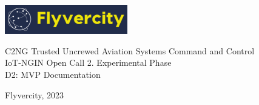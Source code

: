 \documentclass[a4paper]{article}
\begin{document}
 
\thispagestyle{empty}
\begin{flushright}
    \includegraphics[width=0.4\textwidth]{docs/images/Logo.png}
\end{flushright}
\vfill
\begin{center}
    {\LARGE C2NG Trusted Uncrewed Aviation Systems Command and Control} \\
    \vspace{1cm}
    {\Large IoT-NGIN Open Call 2. Experimental Phase} \\
    \vspace{1cm}
    {\Large D2: MVP Documentation}
\end{center}
\vfill
\begin{center}
    Flyvercity, 2023
\end{center}
\end{document}
